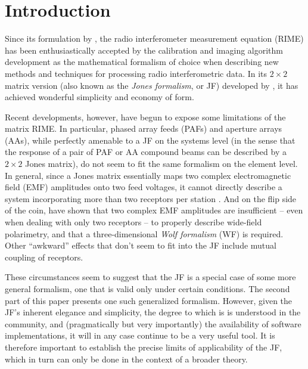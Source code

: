 \documentclass{aa}
\begin{document}
\maketitle

\section*{Introduction}

Since its formulation by \citet{ME1}, the radio interferometer measurement equation (RIME) has been enthusiastically accepted by the calibration and imaging algorithm development as the mathematical formalism of choice when describing new methods and techniques for processing radio interferometric data. In its $2\times2$ matrix version (also known as the \emph{Jones formalism\/}, or JF) developed by \citet{ME4}, it has achieved wonderful simplicity and economy of form. 

Recent developments, however, have begun to expose some limitations of the matrix RIME. In particular, phased array feeds (PAFs) and aperture arrays (AAs), while perfectly amenable to a JF on the systems level (in the sense that the response of a pair of
PAF or AA compound beams can be described by a $2\times2$ Jones matrix), do not seem to fit the same formalism on the element level. In general, since a Jones matrix essentially maps two complex electromagnetic field (EMF) amplitudes onto two feed voltages, it cannot directly describe a system incorporating more than two receptors per station \citep[as in, e.g., the ``tripole'' design of][]{tripole-patent}. And on the flip side of the coin, \citet{Carozzi:ME3D} have shown that two complex EMF amplitudes are insufficient -- even when dealing with only two receptors -- to properly describe wide-field polarimetry, and  that a three-dimensional \emph{Wolf formalism} (WF) is required. Other ``awkward'' effects that don't seem to fit into the JF include mutual coupling of receptors. 

These circumstances seem to suggest that the JF is a special case of some more general formalism, one that is valid only under certain conditions. 
The second part of this paper presents one such generalized formalism. However, given the JF's inherent elegance and simplicity, the degree to which is is understood in the community, and (pragmatically but very importantly) the availability of software implementations, it will in any case 
continue to be a very useful tool. It is therefore important to establish the precise limits of applicability of the JF, which in turn can only be done in the context of a broader theory.
\end{document}
